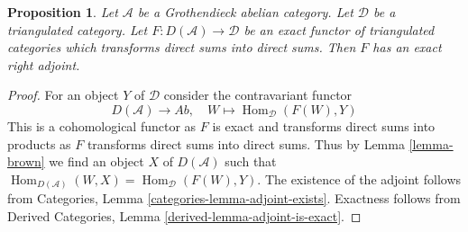 \documentclass{stacks-project}
\theoremstyle{plain}
\newtheorem{proposition}[subsection]{Proposition}
\theoremstyle{definition}
\theoremstyle{remark}
\numberwithin{equation}{subsection}
\def\Hom{\mathop{\mathrm{Hom}}\nolimits}
\begin{document}
\begin{proposition}
\label{proposition-brown}
Let $\mathcal{A}$ be a Grothendieck abelian category. Let $\mathcal{D}$
be a triangulated category. Let $F : D(\mathcal{A}) \to \mathcal{D}$ be an
exact functor of triangulated categories which transforms direct sums
into direct sums. Then $F$ has an exact right adjoint.
\end{proposition}

\begin{proof}
For an object $Y$ of $\mathcal{D}$ consider the contravariant functor
$$
D(\mathcal{A}) \to \textit{Ab},\quad
W \mapsto \Hom_\mathcal{D}(F(W), Y)
$$
This is a cohomological functor as $F$ is exact and transforms direct sums
into products as $F$ transforms direct sums into direct sums. Thus by
Lemma \ref{lemma-brown} we find an object $X$ of $D(\mathcal{A})$ such that
$\Hom_{D(\mathcal{A})}(W, X) = \Hom_\mathcal{D}(F(W), Y)$.
The existence of the adjoint follows from
Categories, Lemma \ref{categories-lemma-adjoint-exists}.
Exactness follows from
Derived Categories, Lemma \ref{derived-lemma-adjoint-is-exact}.
\end{proof}
















\end{document}
